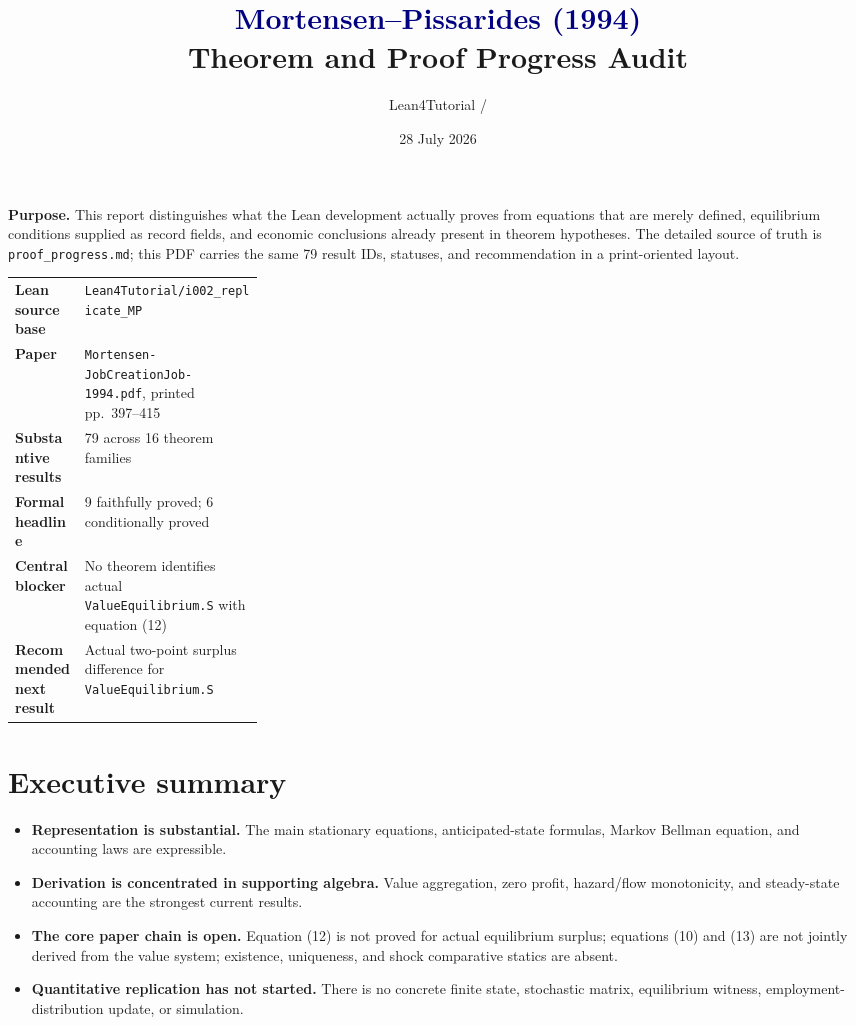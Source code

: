 \documentclass[11pt]{article}
\title{\vspace{-2em}\textcolor{navy}{\textbf{Mortensen--Pissarides (1994)}}\\[0.3em]
\Large Theorem and Proof Progress Audit}
\author{Lean4Tutorial / \code{i002_replicate_MP_v2}}
\date{28 July 2026}
\newcommand{\code}[1]{\nolinkurl{#1}}
\newcommand{\src}[1]{\nolinkurl{#1}}
\begin{document}
\maketitle

\begin{center}
\colorbox{graybg}{\parbox{0.92\linewidth}{
\textbf{Purpose.} This report distinguishes what the Lean development actually proves
from equations that are merely defined, equilibrium conditions supplied as record fields,
and economic conclusions already present in theorem hypotheses. The detailed source of
truth is \code{proof_progress.md}; this PDF carries the same 79 result IDs, statuses, and
recommendation in a print-oriented layout.
}}
\end{center}

\vspace{0.5em}
\begin{tabularx}{\linewidth}{@{}>{\bfseries}p{0.29\linewidth}X@{}}
Lean source base & \src{Lean4Tutorial/i002_replicate_MP} \\
Paper & \src{Mortensen-JobCreationJob-1994.pdf}, printed pp.\ 397--415 \\
Substantive results & 79 across 16 theorem families \\
Formal headline & 9 faithfully proved; 6 conditionally proved \\
Central blocker & No theorem identifies actual \code{ValueEquilibrium.S} with equation (12) \\
Recommended next result & Actual two-point surplus difference for \code{ValueEquilibrium.S} \\
\end{tabularx}

\section*{Executive summary}

\begin{itemize}
  \item \textbf{Representation is substantial.} The main stationary equations,
  anticipated-state formulas, Markov Bellman equation, and accounting laws are expressible.
  \item \textbf{Derivation is concentrated in supporting algebra.} Value aggregation,
  zero profit, hazard/flow monotonicity, and steady-state accounting are the strongest
  current results.
  \item \textbf{The core paper chain is open.} Equation (12) is not proved for actual
  equilibrium surplus; equations (10) and (13) are not jointly derived from the value
  system; existence, uniqueness, and shock comparative statics are absent.
  \item \textbf{Quantitative replication has not started.} There is no concrete finite
  state, stochastic matrix, equilibrium witness, employment-distribution update, or
  simulation.
\end{itemize}
\end{document}
